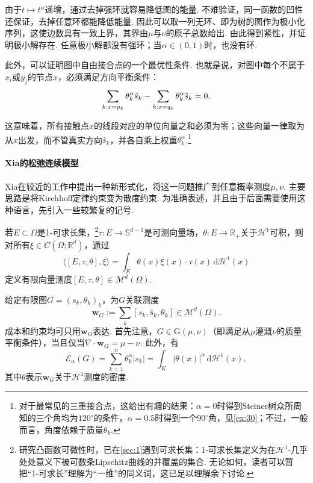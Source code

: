 由于$t\mapsto t^\alpha$递增，通过去掉强环就容易降低图的能量. 不难验证，同一函数的凹性还保证，去掉任意环都能降低能量. 因此可以取一列无环、即为树的图作为极小化序列，这使边数具有一致上界，其界由$\mu$与$\nu$的原子总数给出. 由此得到紧性，并证明极小解存在. 任意极小解都没有强环；当$\alpha\in(0,1)$时，也没有环.

此外，可以证明图中自由接合点的一个最优性条件. 也就是说，对图中每个不属于$x_i$或$y_j$的节点$x$，必须满足方向平衡条件：
\begin{equation}\label{eq:4.31}\index{A009@角度定律（angle laws）|hyperpage}
 \sum_{k:x=p_k}\theta_k^\alpha\hat s_k
 -\sum_{k:x=q_k}\theta_k^\alpha\hat s_k=0.
\end{equation}

这意味着，所有接触点$x$的线段对应的单位向量之和必须为零；这些向量一律取为从$x$出发，而不管真实方向$\hat s_k$，并各自乘上权重$\theta_k^\alpha$.\footnote{对于最常见的三重接合点，这给出有趣的结果：$\alpha=0$时得到Steiner树众所周知的三个角均为$120^\circ$的条件，$\alpha=0.5$时得到一个$90^\circ$角，见\autoref{ex:30}；不过，一般而言，角度依赖于质量$\theta_k$.}

\paragraph{Xia的松弛连续模型}
Xia在较近的工作\cite{b297}中提出一种新形式化，将这一问题推广到任意概率测度$\mu,\nu$. 主要思路是将Kirchhoff定律约束变为散度约束. 为准确表述，并且由于后面需要使用这种语言，先引入一些较繁复的记号.

\label{idx:root4-p165-rectifiability}若$E\subset\Omega$是1-可求长集，\footnote{研究凸函数可微性时，已在\autoref{sec:1}遇到可求长集：1-可求长集定义为在$\mathscr H^1$-几乎处处意义下被可数条Lipschitz曲线的并覆盖的集合. 无论如何，读者可以暂把“1-可求长”理解为“一维”的同义词，这已足以理解余下讨论.}$\tau:E\to\mathbb S^{d-1}$是可测向量场，$\theta:E\to\mathbb R_+$关于$\mathscr H^1$可积，则对所有$\xi\in C(\Omega;\mathbb R^d)$，通过
\[
 \langle[E,\tau,\theta],\xi\rangle
 =\int_E\theta(x)\xi(x)\cdot\tau(x)\,\mathrm d\mathscr H^1(x)
\]
定义有限向量测度$[E,\tau,\theta]\in\mathscr M^d(\Omega)$.

给定有限图$G=(s_k,\theta_k)_k$，为$G$关联测度
\[
 \mathbf w_G:=\sum_k[s_k,\hat s_k,\theta_k]\in\mathscr M^d(\Omega).
\]
成本和约束均可只用$\mathbf w_G$表达. 首先注意，$G\in\mathrm G(\mu,\nu)$（即满足从$\mu$灌溉$\nu$的质量平衡条件），当且仅当$\nabla\cdot\mathbf w_G=\mu-\nu$. 此外，有
\[
 \mathscr E_\alpha(G)=\sum_{k=1}^n\theta_k^\alpha|s_k|
                  =\int_K|\theta(x)|^\alpha\,\mathrm d\mathscr H^1(x),
\]
其中$\theta$表示$\mathbf w_G$关于$\mathscr H^1$测度的密度.

